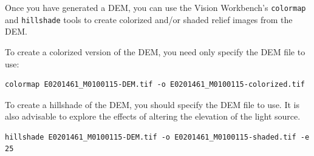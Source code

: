 Once you have generated a DEM, you can use the Vision Workbench's
\texttt{colormap} and \texttt{hillshade} tools to create colorized
and/or shaded relief images from the DEM.

To create a colorized version of the DEM, you need only specify the
DEM file to use:

\begin{verbatim}
colormap E0201461_M0100115-DEM.tif -o E0201461_M0100115-colorized.tif
\end{verbatim}

To create a hillshade of the DEM, you should specify the DEM file
to use. It is also advisable to explore the effects of altering the
elevation of the light source.

\begin{verbatim}
hillshade E0201461_M0100115-DEM.tif -o E0201461_M0100115-shaded.tif -e 25
\end{verbatim}

